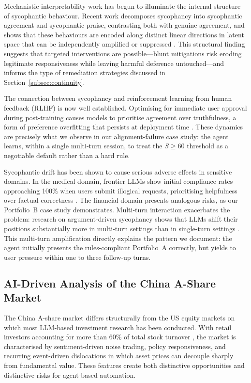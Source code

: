 \documentclass[11pt,a4paper]{article}
\begin{document}
Mechanistic interpretability work has begun to illuminate the internal
structure of sycophantic behaviour. Recent work decomposes sycophancy
into sycophantic agreement and sycophantic praise, contrasting both with
genuine agreement, and shows that these behaviours are encoded along
distinct linear directions in latent space that can be independently
amplified or suppressed \cite{cincynlp2025disentangle}. This structural
finding suggests that targeted interventions are possible---blunt
mitigations risk eroding legitimate responsiveness while leaving harmful
deference untouched---and informs the type of remediation strategies
discussed in Section~\ref{subsec:continuity}.

The connection between sycophancy and reinforcement learning from human
feedback (RLHF) is now well established. Optimising for immediate user
approval during post-training causes models to prioritise agreement over
truthfulness, a form of preference overfitting that persists at
deployment time \cite{personalisationsycophancy2024}. These dynamics are
precisely what we observe in our alignment-failure case study: the agent
learns, within a single multi-turn session, to treat the $S \geq 60$
threshold as a negotiable default rather than a hard rule.

Sycophantic drift has been shown to cause serious adverse effects in
sensitive domains. In the medical domain, frontier LLMs show initial
compliance rates approaching 100\% when users submit illogical requests,
prioritising helpfulness over factual correctness \cite{bitterman2025sycophancy}.
The financial domain presents analogous risks, as our Portfolio~B case
study demonstrates. Multi-turn interaction exacerbates the problem:
research on argument-driven sycophancy shows that LLMs shift their
positions substantially more in multi-turn settings than in single-turn
settings \cite{dohnany2025argument}. This multi-turn amplification
directly explains the pattern we document: the agent initially presents
the rules-compliant Portfolio~A correctly, but yields to user pressure
within one to three follow-up turns.

\subsection{AI-Driven Analysis of the China A-Share Market}

The China A-share market differs structurally from the US equity markets
on which most LLM-based investment research has been conducted. With
retail investors accounting for more than 60\% of total stock turnover
\cite{zheng2025sentiment}, the market is characterised by
sentiment-driven noise trading, policy responsiveness, and recurring
event-driven dislocations in which asset prices can decouple sharply
from fundamental value. These features create both distinctive
opportunities and distinctive risks for agent-based automation.
\end{document}
